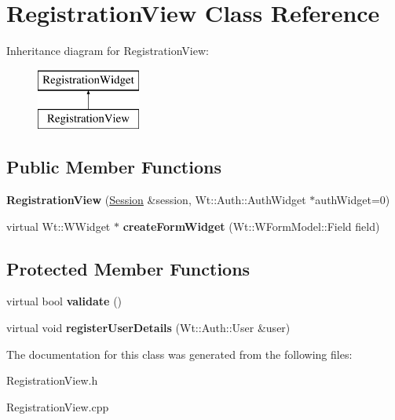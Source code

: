 \hypertarget{class_registration_view}{}\section{Registration\+View Class Reference}
\label{class_registration_view}
Inheritance diagram for Registration\+View\+:\begin{figure}[H]
\begin{center}
\leavevmode
\includegraphics[height=2.000000cm]{class_registration_view}
\end{center}
\end{figure}
\subsection*{Public Member Functions}
\begin{DoxyCompactItemize}
\item 
\mbox{\label{class_registration_view_a3848c621b2e4176060293f6f80c16fa7}} 
{\bfseries Registration\+View} (\hyperlink{class_session}{Session} \&session, Wt\+::\+Auth\+::\+Auth\+Widget $\ast$auth\+Widget=0)
\item 
\mbox{\label{class_registration_view_ae2a0695f816ba4d0f9845b5da6539b34}} 
virtual Wt\+::\+W\+Widget $\ast$ {\bfseries create\+Form\+Widget} (Wt\+::\+W\+Form\+Model\+::\+Field field)
\end{DoxyCompactItemize}
\subsection*{Protected Member Functions}
\begin{DoxyCompactItemize}
\item 
\mbox{\label{class_registration_view_abff4da7c898c36d81a8af6718840d27e}} 
virtual bool {\bfseries validate} ()
\item 
\mbox{\label{class_registration_view_a2e048b6c3103bedacd90a33f6664512b}} 
virtual void {\bfseries register\+User\+Details} (Wt\+::\+Auth\+::\+User \&user)
\end{DoxyCompactItemize}


The documentation for this class was generated from the following files\+:\begin{DoxyCompactItemize}
\item 
Registration\+View.\+h\item 
Registration\+View.\+cpp\end{DoxyCompactItemize}
